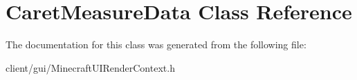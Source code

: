 \hypertarget{class_caret_measure_data}{}\section{Caret\+Measure\+Data Class Reference}
\label{class_caret_measure_data}


The documentation for this class was generated from the following file\+:\begin{DoxyCompactItemize}
\item 
client/gui/Minecraft\+U\+I\+Render\+Context.\+h\end{DoxyCompactItemize}
